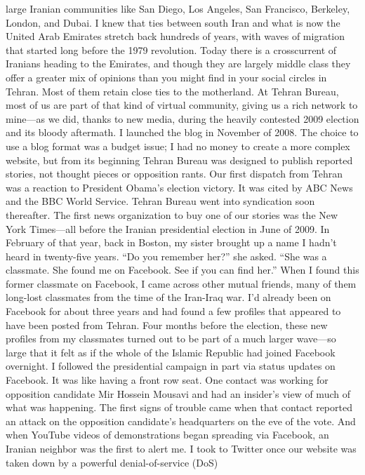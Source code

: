 large Iranian communities like San Diego, Los Angeles, San Francisco, Berkeley,
London, and Dubai. I knew that ties between south Iran and what is now the United Arab
Emirates stretch back hundreds of years, with waves of migration that started long before
the 1979 revolution. Today there is a crosscurrent of Iranians heading to the Emirates,
and though they are largely middle class they offer a greater mix of opinions than you
might find in your social circles in Tehran. Most of them retain close ties to the
motherland. At Tehran Bureau, most of us are part of that kind of virtual community,
giving us a rich network to mine—as we did, thanks to new media, during the heavily
contested 2009 election and its bloody aftermath.
I launched the blog in November of 2008. The choice to use a blog format was a budget
issue; I had no money to create a more complex website, but from its beginning Tehran
Bureau was designed to publish reported stories, not thought pieces or opposition rants.
Our first dispatch from Tehran was a reaction to President Obama’s election victory. It
was cited by ABC News and the BBC World Service. Tehran Bureau went into
syndication soon thereafter. The first news organization to buy one of our stories was the
New York Times—all before the Iranian presidential election in June of 2009.
In February of that year, back in Boston, my sister brought up a name I hadn’t heard in
twenty-five years. ``Do you remember her?'' she asked. ``She was a classmate. She found
me on Facebook. See if you can find her.'' When I found this former classmate on
Facebook, I came across other mutual friends, many of them long-lost classmates from
the time of the Iran-Iraq war. I’d already been on Facebook for about three years and had
found a few profiles that appeared to have been posted from Tehran.
Four months before the election, these new profiles from my classmates turned out to be
part of a much larger wave—so large that it felt as if the whole of the Islamic Republic
had joined Facebook overnight. I followed the presidential campaign in part via status
updates on Facebook. It was like having a front row seat. One contact was working for
opposition candidate Mir Hossein Mousavi and had an insider’s view of much of what
was happening. The first signs of trouble came when that contact reported an attack on
the opposition candidate’s headquarters on the eve of the vote. And when YouTube
videos of demonstrations began spreading via Facebook, an Iranian neighbor was the first
to alert me.
I took to Twitter once our website was taken down by a powerful denial-of-service (DoS)
